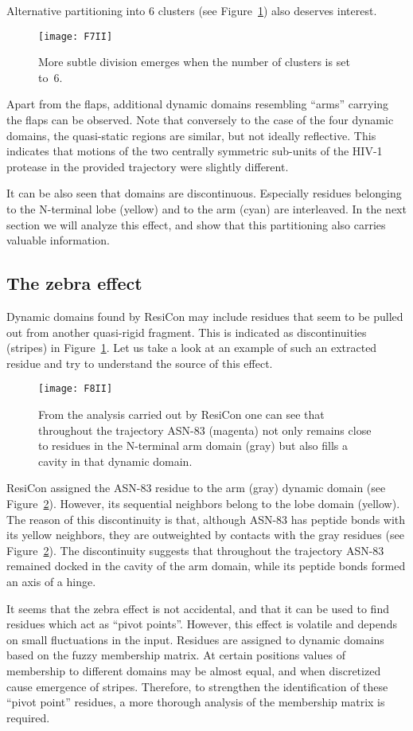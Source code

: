 Alternative partitioning into 6 clusters (see Figure~\ref{6clusters}) also deserves interest.
\begin{figure}
\centering
\texttt{[image: F7II]}
\caption{
More subtle division emerges when the number of clusters is set to~6.
}
\label{6clusters}
\end{figure}
Apart from the flaps, additional dynamic domains resembling ``arms'' carrying the flaps can be observed.
Note that conversely to the case of the four dynamic domains, the quasi-static regions are similar, but not ideally reflective.
This indicates that motions of the two centrally symmetric sub-units of the HIV-1 protease in the provided trajectory were slightly different.

It can be also seen that domains are discontinuous.
Especially residues belonging to the N-terminal lobe (yellow) and to the arm (cyan) are interleaved.
In the next section we will analyze this effect, and show that this partitioning also carries valuable information.

\subsection*{The zebra effect}
Dynamic domains found by ResiCon may include residues that seem to be pulled out from another quasi-rigid fragment.
This is indicated as discontinuities (stripes) in Figure~\ref{6clusters}.
Let us take a look at an example of such an extracted residue and try to understand the source of this effect.
\begin{figure}
\centering
\texttt{[image: F8II]}
\caption{
From the analysis carried out by ResiCon one can see that throughout the trajectory ASN-83 (magenta) not only remains close to residues in the N-terminal arm domain (gray) but also fills a cavity in that dynamic domain.
}
\label{eradicated}
\end{figure}
ResiCon assigned the ASN-83 residue to the arm (gray) dynamic domain (see Figure~\ref{eradicated}).
However, its sequential neighbors belong to the lobe domain (yellow).
The reason of this discontinuity is that, although ASN-83 has peptide bonds with its yellow neighbors, they are outweighted by contacts with the gray residues (see Figure~\ref{eradicated}).
The discontinuity suggests that throughout the trajectory ASN-83 remained docked in the cavity of the arm domain, while its peptide bonds formed an axis of a hinge.

It seems that the zebra effect is not accidental, and that it can be used to find residues which act as ``pivot points''. 
However, this effect is volatile and depends on small fluctuations in the input.
Residues are assigned to dynamic domains based on the fuzzy membership matrix.
At certain positions values of membership to different domains may be almost equal, and when discretized cause emergence of stripes.
Therefore, to strengthen the identification of these ``pivot point'' residues, a more thorough analysis of the membership matrix is required.


